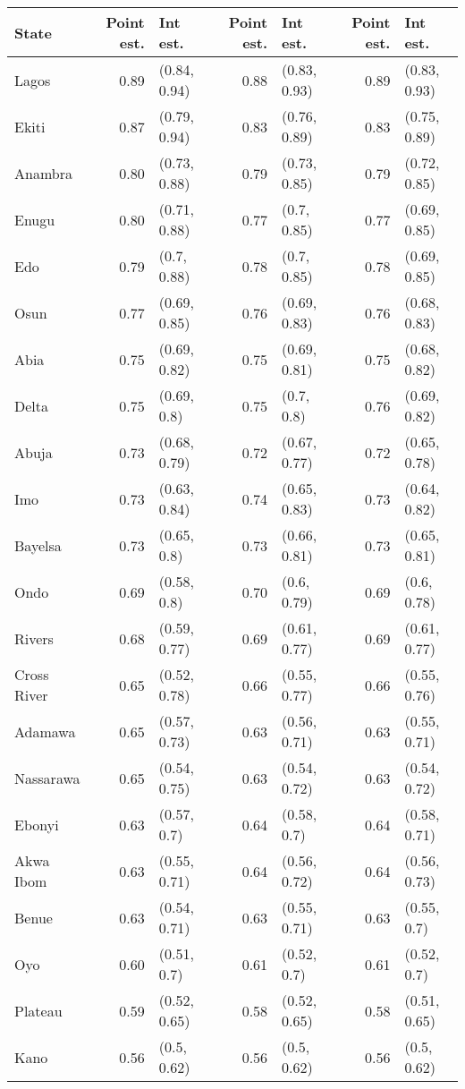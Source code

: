 
\begin{tabular}{lrlrlrl}
\toprule
State & Point est. & Int est. & Point est. & Int est. & Point est. & Int est.\\
\midrule
Lagos & 0.89 & (0.84, 0.94) & 0.88 & (0.83, 0.93) & 0.89 & (0.83, 0.93)\\
Ekiti & 0.87 & (0.79, 0.94) & 0.83 & (0.76, 0.89) & 0.83 & (0.75, 0.89)\\
Anambra & 0.80 & (0.73, 0.88) & 0.79 & (0.73, 0.85) & 0.79 & (0.72, 0.85)\\
Enugu & 0.80 & (0.71, 0.88) & 0.77 & (0.7, 0.85) & 0.77 & (0.69, 0.85)\\
Edo & 0.79 & (0.7, 0.88) & 0.78 & (0.7, 0.85) & 0.78 & (0.69, 0.85)\\
Osun & 0.77 & (0.69, 0.85) & 0.76 & (0.69, 0.83) & 0.76 & (0.68, 0.83)\\
Abia & 0.75 & (0.69, 0.82) & 0.75 & (0.69, 0.81) & 0.75 & (0.68, 0.82)\\
Delta & 0.75 & (0.69, 0.8) & 0.75 & (0.7, 0.8) & 0.76 & (0.69, 0.82)\\
Abuja & 0.73 & (0.68, 0.79) & 0.72 & (0.67, 0.77) & 0.72 & (0.65, 0.78)\\
Imo & 0.73 & (0.63, 0.84) & 0.74 & (0.65, 0.83) & 0.73 & (0.64, 0.82)\\
Bayelsa & 0.73 & (0.65, 0.8) & 0.73 & (0.66, 0.81) & 0.73 & (0.65, 0.81)\\
Ondo & 0.69 & (0.58, 0.8) & 0.70 & (0.6, 0.79) & 0.69 & (0.6, 0.78)\\
Rivers & 0.68 & (0.59, 0.77) & 0.69 & (0.61, 0.77) & 0.69 & (0.61, 0.77)\\
Cross River & 0.65 & (0.52, 0.78) & 0.66 & (0.55, 0.77) & 0.66 & (0.55, 0.76)\\
Adamawa & 0.65 & (0.57, 0.73) & 0.63 & (0.56, 0.71) & 0.63 & (0.55, 0.71)\\
Nassarawa & 0.65 & (0.54, 0.75) & 0.63 & (0.54, 0.72) & 0.63 & (0.54, 0.72)\\
Ebonyi & 0.63 & (0.57, 0.7) & 0.64 & (0.58, 0.7) & 0.64 & (0.58, 0.71)\\
Akwa Ibom & 0.63 & (0.55, 0.71) & 0.64 & (0.56, 0.72) & 0.64 & (0.56, 0.73)\\
Benue & 0.63 & (0.54, 0.71) & 0.63 & (0.55, 0.71) & 0.63 & (0.55, 0.7)\\
Oyo & 0.60 & (0.51, 0.7) & 0.61 & (0.52, 0.7) & 0.61 & (0.52, 0.7)\\
Plateau & 0.59 & (0.52, 0.65) & 0.58 & (0.52, 0.65) & 0.58 & (0.51, 0.65)\\
Kano & 0.56 & (0.5, 0.62) & 0.56 & (0.5, 0.62) & 0.56 & (0.5, 0.62)\\

\end{tabular}
